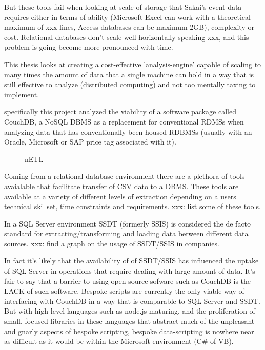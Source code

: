 \documentclass[parskip=full]{scrartcl}
\begin{document}
But these tools fail when looking at scale of storage that Sakai's event data requires either in terms of ability (Microsoft Excel can work with a theoretical maximum of xxx lines, Access databases can be maximum 2GB), complexity or cost. Relational databases don't scale well horizontally speaking xxx, and this problem is going become more pronounced with time.

This thesis looks at creating a cost-effective 'analysis-engine' capable of scaling to many times the amount of data that a single machine can hold in a way that is still effective to analyze (distributed computing) and not too mentally taxing to implement.

specifically this project analyzed the viability of a software package called CouchDB, a NoSQL DBMS as a replacement for conventional RDMSs when analyzing data that has conventionally been housed RDBMSs (usually with an Oracle, Microsoft or SAP price tag associated with it).



\begin{figure}[H]
    \centering
    
    \caption[nETL]{nETL}
    \label{nETL}
\end{figure}
\newpage

Coming from a relational database environment there are a plethora of tools avaialable that facilitate transfer of CSV dato to a DBMS. These tools are available at a variety of different levels of extraction depending on a users technical skillset, time constraints and requirements. xxx: list some of these tools.

In a SQL Server environment SSDT (formerly SSIS) is considered the de facto standard for extracting/transforming and loading data between different data sources. xxx: find a graph on the usage of SSDT/SSIS in companies.

In fact it's likely that the availability of of SSDT/SSIS has influenced the uptake of SQL Server in operations that require dealing with large amount of data. It's fair to say that a barrier to using open source sofware such as CouchDB is the LACK of such software. Bespoke scripts are currently the only viable way of interfacing with CouchDB in a way that is comparable to SQL Server and SSDT. But with high-level languages such as node.js maturing, and the proliferation of small, focused libraries in these languages that abstract much of the unpleasant and gnarly aspects of bespoke scripting, bespoke data-scripting is nowhere near as difficult as it would be within the Microsoft environment (C\# of VB).
\end{document}
